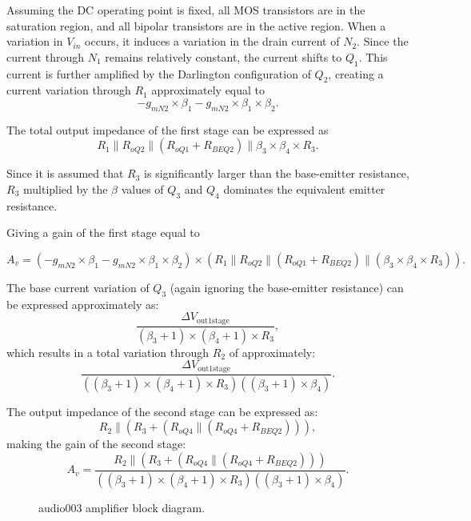 \documentclass[12pt]{article}
\begin{document}
Assuming the DC operating point is fixed, all MOS transistors are in the saturation region, and all bipolar transistors are in the active region. When a variation in $V_{in}$ occurs, it induces a variation in the drain current of $N_2$. Since the current through $N_1$ remains relatively constant, the current shifts to $Q_1$. This current is further amplified by the Darlington configuration of $Q_2$, creating a current variation through $R_1$ approximately equal to
\[
-g_{mN2} \times \beta_1 - g_{mN2} \times \beta_1 \times \beta_2.
\]  

The total output impedance of the first stage can be expressed as
\[
R_1 \parallel R_{oQ2} \parallel (R_{oQ1} + R_{BEQ2}) \parallel \beta_3 \times \beta_4 \times R_3.
\]  

Since it is assumed that $R_3$ is significantly larger than the base-emitter resistance, $R_3$ multiplied by the $\beta$ values of $Q_3$ and $Q_4$ dominates the equivalent emitter resistance. 

Giving a gain of the first stage equal to

\begin{equation}
    A_v = (-g_{mN2} \times \beta_1 - g_{mN2} \times \beta_1 \times \beta_2) \times (R_1 \parallel R_{oQ2} \parallel (R_{oQ1} + R_{BEQ2}) \parallel( \beta_3 \times \beta_4 \times R_3)).
\end{equation}

The base current variation of $Q_3$ (again ignoring the base-emitter resistance) can be expressed approximately as:  
\[
\frac{\Delta V_{\text{out1stage}}}{(\beta_3 + 1) \times (\beta_4 + 1) \times R_3},
\]  
which results in a total variation through $R_2$ of approximately:  
\[
\frac{\Delta V_{\text{out1stage}}}{((\beta_3 + 1) \times (\beta_4 + 1) \times R_3)((\beta_3 + 1) \times \beta_4)}.
\]  

The output impedance of the second stage can be expressed as:  
\[
R_2 \parallel \left(R_3 + \left(R_{oQ4} \parallel \left(R_{oQ4} + R_{BEQ2}\right)\right)\right),
\]  
making the gain of the second stage:  
\[
A_v = \frac{R_2 \parallel \left(R_3 + \left(R_{oQ4} \parallel \left(R_{oQ4} + R_{BEQ2}\right)\right)\right)}{((\beta_3 + 1) \times (\beta_4 + 1) \times R_3)((\beta_3 + 1) \times \beta_4)}.
\]





\begin{figure}[H]
        \centering
        
        \caption{audio003 amplifier block diagram.}
        \label{audio003_diag}
\end{figure}
\end{document}
